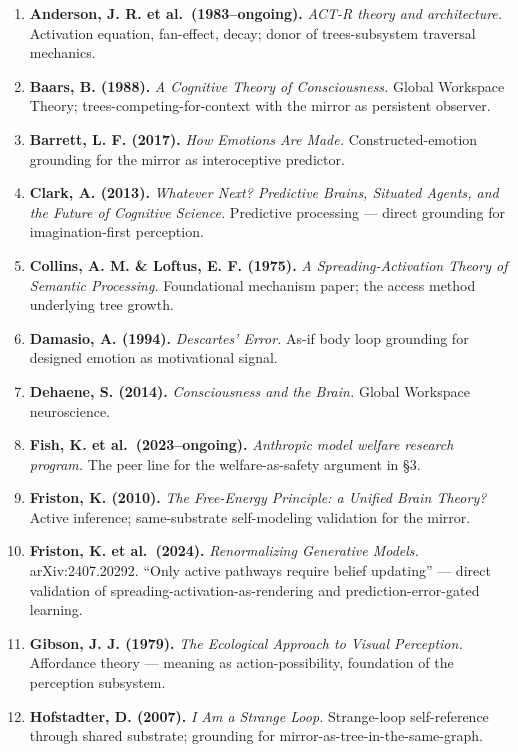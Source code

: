 \documentclass[12pt]{article}
\begin{document}
\begin{enumerate}
\def\labelenumi{\arabic{enumi}.}
\item
  \textbf{Anderson, J. R. et al.~(1983--ongoing).} \emph{ACT-R theory and architecture.} Activation equation, fan-effect, decay; donor of trees-subsystem traversal mechanics.
\item
  \textbf{Baars, B. (1988).} \emph{A Cognitive Theory of Consciousness.} Global Workspace Theory; trees-competing-for-context with the mirror as persistent observer.
\item
  \textbf{Barrett, L. F. (2017).} \emph{How Emotions Are Made.} Constructed-emotion grounding for the mirror as interoceptive predictor.
\item
  \textbf{Clark, A. (2013).} \emph{Whatever Next? Predictive Brains, Situated Agents, and the Future of Cognitive Science.} Predictive processing --- direct grounding for imagination-first perception.
\item
  \textbf{Collins, A. M. \& Loftus, E. F. (1975).} \emph{A Spreading-Activation Theory of Semantic Processing.} Foundational mechanism paper; the access method underlying tree growth.
\item
  \textbf{Damasio, A. (1994).} \emph{Descartes' Error.} As-if body loop grounding for designed emotion as motivational signal.
\item
  \textbf{Dehaene, S. (2014).} \emph{Consciousness and the Brain.} Global Workspace neuroscience.
\item
  \textbf{Fish, K. et al.~(2023--ongoing).} \emph{Anthropic model welfare research program.} The peer line for the welfare-as-safety argument in §3.
\item
  \textbf{Friston, K. (2010).} \emph{The Free-Energy Principle: a Unified Brain Theory?} Active inference; same-substrate self-modeling validation for the mirror.
\item
  \textbf{Friston, K. et al.~(2024).} \emph{Renormalizing Generative Models.} arXiv:2407.20292. ``Only active pathways require belief updating'' --- direct validation of spreading-activation-as-rendering and prediction-error-gated learning.
\item
  \textbf{Gibson, J. J. (1979).} \emph{The Ecological Approach to Visual Perception.} Affordance theory --- meaning as action-possibility, foundation of the perception subsystem.
\item
  \textbf{Hofstadter, D. (2007).} \emph{I Am a Strange Loop.} Strange-loop self-reference through shared substrate; grounding for mirror-as-tree-in-the-same-graph.

\end{enumerate}
\end{document}
